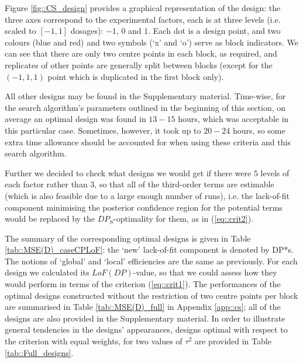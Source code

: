 Figure \ref{fig::CS_design} provides a graphical representation of the design: the three axes correspond to the experimental factors, each is at three levels (i.e. scaled to $[-1,1]$ dosages): $-1$, $0$ and $1$. Each dot is a design point, and two colours (blue and red) and two symbols (`x' and `o') serve as block indicators. We can see that there are only two centre points in each block, as required, and replicates of other points are generally split between blocks (except for the $(-1,1,1)$ point which is duplicated in the first block only). 

All other designs may be found in the Supplementary material. Time-wise, for the search algorithm's parameters outlined in the beginning of this section, on average an optimal design was found in $13-15$ hours, which was acceptable in this particular case. Sometimes, however, it took up to $20-24$ hours, so some extra time allowance should be accounted for when using these criteria and this search algorithm. 

Further we decided to check what designs we would get if there were $5$ levels of each factor rather than $3$, so that all of the third-order terms are estimable (which is also feasible due to a large enough number of runs), i.e. the lack-of-fit component minimising the posterior confidence region for the potential terms would be replaced by the $DP_S$-optimality for them, as in (\ref{eq::crit2}). 

The summary of the corresponding optimal designs is given in Table \ref{tab::MSE(D)_caseCPLoF}: the `new' lack-of-fit component is denoted by DP*s. The notions of `global'  and `local' efficiencies are the same as previously. For each design we calculated its $LoF(DP)$-value, so that we could assess how they would perform in terms of the criterion (\ref{eq::crit1}). The performances of the optimal designs constructed without the restriction of two centre points per block are summarised in Table \ref{tab::MSE(D)_full} in Appendix \ref{app::cs}; all of the designs are also provided in the Supplementary material. In order to illustrate general tendencies in the designs' appearances, designs optimal with respect to the criterion with equal weights, for two values of $\tau^2$ are provided in Table \ref{tab::Full_designs}.

